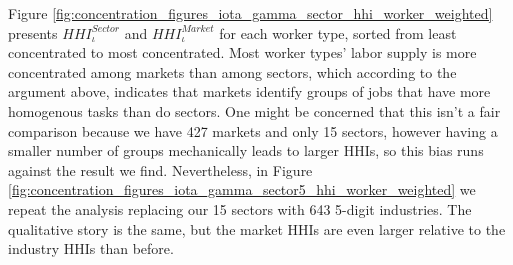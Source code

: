 \documentclass[12pt]{article}
\def\i{\iota}
\theoremstyle{definition}
\theoremstyle{plain}
\begin{document}
Figure \ref{fig:concentration_figures_iota_gamma_sector_hhi_worker_weighted} presents $ HHI_{\i}^{Sector}$ and $ HHI_{\i}^{Market}$ for each worker type, sorted from least concentrated to most concentrated. Most worker types' labor supply is more concentrated among markets than among sectors, which according to the argument above, indicates that markets identify groups of jobs that have more homogenous tasks than do sectors. One might be concerned that this isn't a fair comparison because we have 427 markets and only 15 sectors, however having a smaller number of groups mechanically leads to larger HHIs, so this bias runs against the result we find. Nevertheless, in Figure \ref{fig:concentration_figures_iota_gamma_sector5_hhi_worker_weighted} we repeat the analysis replacing our 15 sectors with 643 5-digit industries. The qualitative story is the same, but the market HHIs are even larger relative to the industry HHIs than before. 
\end{document}
